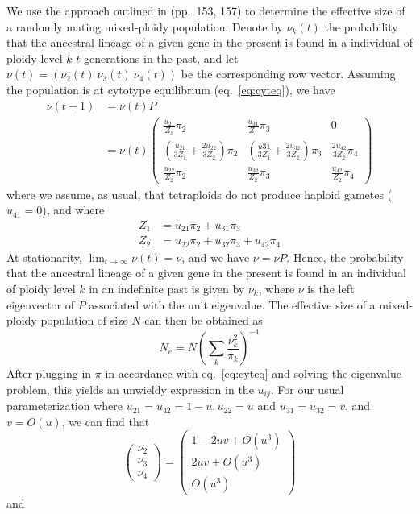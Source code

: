 \documentclass[11pt,a4paper]{article}
\begin{document}
We use the approach outlined in \citep{rousset2004} (pp.~153, 157) to
determine the effective size of a randomly mating mixed-ploidy
population. Denote by \(\nu_k(t)\) the probability that the ancestral
lineage of a given gene in the present is found in a individual of
ploidy level \(k\) \(t\) generations in the past, and let
\(\nu(t) = (\nu_2(t)\ \nu_3(t)\ \nu_4(t))\) be the corresponding row
vector. Assuming the population is at cytotype equilibrium
(eq.~\ref{eq:cyteq}), we have 
  \begin{align}
      \nu(t+1) &= \nu(t) P \nonumber \\
               &= \nu(t) \begin{pmatrix}
      \frac{u_{21}}{Z_1}\pi_2 & \frac{u_{31}}{Z_1}\pi_3 & 0 \\
      \left(\frac{u_{21}}{3Z_1} + \frac{2u_{22}}{3Z_2}\right)\pi_2 &
          \left(\frac{u{31}}{3Z_1} + \frac{2u_{32}}{3Z_2}\right)\pi_3 & 
          \frac{2u_{42}}{3Z_2}\pi_4 \\
      \frac{u_{22}}{Z_2}\pi_2 & \frac{u_{32}}{Z_2}\pi_3 & \frac{u_{42}}{Z_2}\pi_4
      \label{eq:markovch}
       \end{pmatrix}
  \end{align}
where we assume, as usual, that tetraploids do not
produce haploid gametes (\(u_{41} = 0\)), and where \begin{align*}
  Z_1 &= u_{21} \pi_2+ u_{31} \pi_3 \\
  Z_2 &= u_{22} \pi_2 + u_{32} \pi_3 + u_{42} \pi_4
\end{align*} At stationarity,
\(\lim_{t\rightarrow \infty} \nu(t) = \nu\), and we have
\(\nu = \nu P\). Hence, the probability that the ancestral lineage of a
given gene in the present is found in an individual of ploidy level
\(k\) in an indefinite past is given by \(\nu_k\), where \(\nu\) is the
left eigenvector of \(P\) associated with the unit eigenvalue. The
effective size of a mixed-ploidy population of size \(N\) can then be
obtained as \[N_e = N\left(\sum_k \frac{\nu_k^2}{\pi_k}\right)^{-1}\]
After plugging in \(\pi\) in accordance with eq.~\ref{eq:cyteq} and
solving the eigenvalue problem, this yields an unwieldy expression in
the \(u_{ij}\). For our usual parameterization where
\(u_{21} = u_{42} = 1-u, u_{22} = u\) and \(u_{31} = u_{32} = v\), and
\(v = O(u)\), we can find that
\[\begin{pmatrix}\nu_2 \\ \nu_3 \\ \nu_4\end{pmatrix} = \begin{pmatrix}
    1-2uv + O(u^3) \\ 2uv + O(u^3) \\ O(u^3)\end{pmatrix}\] and
\end{document}
